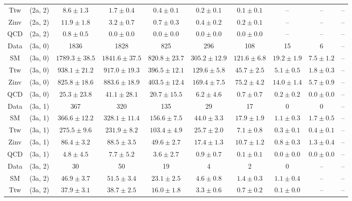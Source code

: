 \begin{table}[h!]
{\begin{tabular}{cccccccccc}
	Ttw & (2a, 2) & $8.6\pm 1.3$ & $1.7\pm 0.4$ & $0.4\pm 0.1$ & $0.2\pm 0.1$ & $0.1\pm 0.1$ & -- & -- & -- \\[0.5ex] 
	Zinv & (2a, 2) & $11.9\pm 1.8$ & $3.2\pm 0.7$ & $0.7\pm 0.3$ & $0.4\pm 0.2$ & $0.2\pm 0.1$ & -- & -- & -- \\[0.5ex] 
	QCD & (2a, 2) & $0.8\pm 0.5$ & $0.0\pm 0.0$ & $0.0\pm 0.0$ & $0.0\pm 0.0$ & $0.0\pm 0.0$ & -- & -- & -- \\[0.5ex] 
	Data & (3a, 0) & 1836 & 1828 & 825 & 296 & 108 & 15 & 6 & -- \\[0.5ex] 
	SM & (3a, 0) & $1789.3\pm 38.5$ & $1841.6\pm 37.5$ & $820.8\pm 23.7$ & $305.2\pm 12.9$ & $121.6\pm 6.8$ & $19.2\pm 1.9$ & $7.5\pm 1.2$ & -- \\[0.5ex] 
	Ttw & (3a, 0) & $938.1\pm 21.2$ & $917.0\pm 19.3$ & $396.5\pm 12.1$ & $129.6\pm 5.8$ & $45.7\pm 2.5$ & $5.1\pm 0.5$ & $1.8\pm 0.3$ & -- \\[0.5ex] 
	Zinv & (3a, 0) & $825.8\pm 18.6$ & $883.6\pm 18.9$ & $403.5\pm 12.4$ & $169.4\pm 7.5$ & $75.2\pm 4.2$ & $14.0\pm 1.4$ & $5.7\pm 0.9$ & -- \\[0.5ex] 
	QCD & (3a, 0) & $25.3\pm 23.8$ & $41.1\pm 28.1$ & $20.7\pm 15.5$ & $6.2\pm 4.6$ & $0.7\pm 0.7$ & $0.2\pm 0.2$ & $0.0\pm 0.0$ & -- \\[0.5ex] 
	Data & (3a, 1) & 367 & 320 & 135 & 29 & 17 & 0 & 0 & -- \\[0.5ex] 
	SM & (3a, 1) & $366.6\pm 12.2$ & $328.1\pm 11.4$ & $156.6\pm 7.5$ & $44.0\pm 3.3$ & $17.9\pm 1.9$ & $1.1\pm 0.3$ & $1.7\pm 0.5$ & -- \\[0.5ex] 
	Ttw & (3a, 1) & $275.5\pm 9.6$ & $231.9\pm 8.2$ & $103.4\pm 4.9$ & $25.7\pm 2.0$ & $7.1\pm 0.8$ & $0.3\pm 0.1$ & $0.4\pm 0.1$ & -- \\[0.5ex] 
	Zinv & (3a, 1) & $86.4\pm 3.2$ & $88.5\pm 3.5$ & $49.6\pm 2.7$ & $17.4\pm 1.3$ & $10.7\pm 1.2$ & $0.8\pm 0.3$ & $1.3\pm 0.4$ & -- \\[0.5ex] 
	QCD & (3a, 1) & $4.8\pm 4.5$ & $7.7\pm 5.2$ & $3.6\pm 2.7$ & $0.9\pm 0.7$ & $0.1\pm 0.1$ & $0.0\pm 0.0$ & $0.0\pm 0.0$ & -- \\[0.5ex] 
	Data & (3a, 2) & 30 & 50 & 19 & 4 & 2 & 0 & -- & -- \\[0.5ex] 
	SM & (3a, 2) & $46.9\pm 3.7$ & $51.5\pm 3.4$ & $23.1\pm 2.5$ & $4.6\pm 0.8$ & $1.4\pm 0.3$ & $1.1\pm 0.4$ & -- & -- \\[0.5ex] 
	Ttw & (3a, 2) & $37.9\pm 3.1$ & $38.7\pm 2.5$ & $16.0\pm 1.8$ & $3.3\pm 0.6$ & $0.7\pm 0.2$ & $0.1\pm 0.0$ & -- & -- \\[0.5ex] 

\end{tabular}}
\end{table}
